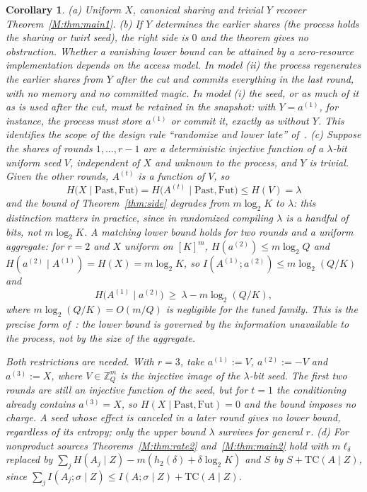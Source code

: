 \documentclass[aps,prx,twocolumn,superscriptaddress,nofootinbib,longbibliography]{revtex4-2}
\theoremstyle{plain}
\newtheorem{corollary}{Corollary}
\theoremstyle{definition}
\theoremstyle{remark}
\newcommand{\Z}{\mathbb{Z}}
\begin{document}
\begin{corollary}\label{cor:side}
(a) Uniform $X$, canonical sharing and trivial $Y$ recover Theorem~\ref{M:thm:main1}.
(b) If $Y$ determines the earlier shares (the process holds the sharing or twirl seed), the right side is $0$ and the theorem gives no obstruction. Whether a vanishing lower bound can be attained by a zero-resource implementation depends on the access model. In model (ii) the process regenerates the earlier shares from $Y$ after the cut and commits everything in the last round, with no memory and no committed magic. In model (i) the seed, or as much of it as is used after the cut, must be retained in the snapshot: with $Y=a^{(1)}$, for instance, the process must store $a^{(1)}$ or commit it, exactly as without $Y$. This identifies the scope of the design rule ``randomize and lower late'' of~\cite{Paper1}.
(c) Suppose the shares of rounds $1,\dots,r-1$ are a deterministic injective function of a $\lambda$-bit uniform seed $V$, independent of $X$ and unknown to the process, and $Y$ is trivial. Given the other rounds, $A^{(t)}$ is a function of $V$, so
\[H\big(X\mid\mathrm{Past},\mathrm{Fut}\big)=H\big(A^{(t)}\mid\mathrm{Past},\mathrm{Fut}\big)\le H(V)=\lambda\]
and the bound of Theorem~\ref{thm:side} degrades from $m\log_2K$ to $\lambda$: this distinction matters in practice, since in randomized compiling $\lambda$ is a handful of bits, not $m\log_2K$. A matching lower bound holds for two rounds and a uniform aggregate: for $r=2$ and $X$ uniform on $[K]^m$, $H(a^{(2)})\le m\log_2Q$ and $H(a^{(2)}\mid A^{(1)})=H(X)=m\log_2K$, so $I(A^{(1)};a^{(2)})\le m\log_2(Q/K)$ and
\[H\big(A^{(1)}\mid a^{(2)}\big)\ \ge\ \lambda-m\log_2(Q/K),\]
where $m\log_2(Q/K)=O(m/Q)$ is negligible for the tuned family. This is the precise form of~\cite[Rem.~9]{Paper1}: the lower bound is governed by the information unavailable to the process, not by the size of the aggregate.

Both restrictions are needed. With $r=3$, take $a^{(1)}:=V$, $a^{(2)}:=-V$ and $a^{(3)}:=X$, where $V\in\Z_Q^m$ is the injective image of the $\lambda$-bit seed. The first two rounds are still an injective function of the seed, but for $t=1$ the conditioning already contains $a^{(3)}=X$, so $H(X\mid\mathrm{Past},\mathrm{Fut})=0$ and the bound imposes no charge. A seed whose effect is canceled in a later round gives no lower bound, regardless of its entropy; only the upper bound $\lambda$ survives for general $r$.
(d) For nonproduct sources Theorems~\ref{M:thm:rate2} and~\ref{M:thm:main2} hold with $m\ell_\delta$ replaced by $\sum_jH(A_j\mid Z)-m(h_2(\delta)+\delta\log_2K)$ and $S$ by $S+\mathrm{TC}(A\mid Z)$, since $\sum_jI(A_j;\sigma\mid Z)\le I(A;\sigma\mid Z)+\mathrm{TC}(A\mid Z)$.
\end{corollary}
\end{document}
